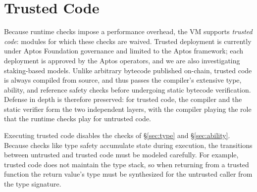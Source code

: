 \section{Trusted Code}
\label{sec:trusted}

Because runtime checks impose a performance overhead, the VM supports \emph{trusted code}: modules for which these checks are waived.
Trusted deployment is currently under Aptos Foundation governance and limited to the Aptos framework; each deployment is approved by the Aptos operators, and we are also investigating staking-based models.
Unlike arbitrary bytecode published on-chain, trusted code is always compiled from source, and thus passes the compiler's extensive type, ability, and reference safety checks before undergoing static bytecode verification.
Defense in depth is therefore preserved: for trusted code, the compiler and the static verifier form the two independent layers, with the compiler playing the role that the runtime checks play for untrusted code.

Executing trusted code disables the checks of \S\ref{sec:type} and \S\ref{sec:ability}.
Because checks like type safety accumulate state during execution, the transitions between untrusted and trusted code must be modeled carefully.
For example, trusted code does not maintain the type stack, so when returning from a trusted function the return value's type must be synthesized for the untrusted caller from the type signature.


